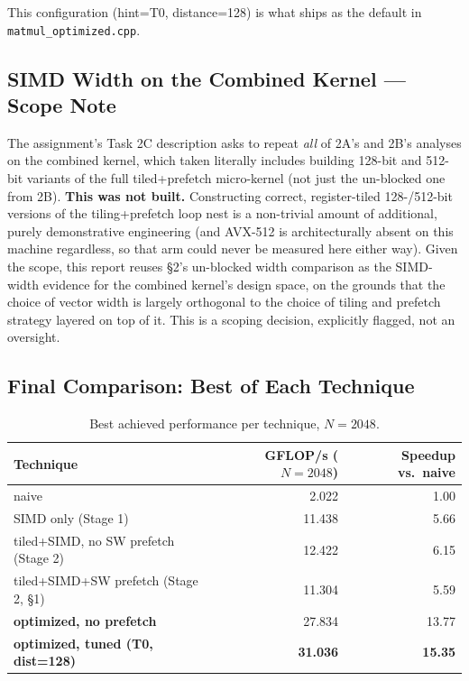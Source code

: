 \documentclass[11pt]{article}
\begin{document}
This configuration (hint=T0, distance=128) is what ships as the default in
\texttt{matmul\_optimized.cpp}.

\subsection{SIMD Width on the Combined Kernel --- Scope Note}

The assignment's Task 2C description asks to repeat \emph{all} of 2A's and 2B's analyses
on the combined kernel, which taken literally includes building 128-bit and 512-bit
variants of the full tiled+prefetch micro-kernel (not just the un-blocked one from 2B).
\textbf{This was not built.} Constructing correct, register-tiled 128-/512-bit versions
of the tiling+prefetch loop nest is a non-trivial amount of additional, purely
demonstrative engineering (and AVX-512 is architecturally absent on this machine
regardless, so that arm could never be measured here either way). Given the scope, this
report reuses \S2's un-blocked width comparison as the SIMD-width evidence for the
combined kernel's design space, on the grounds that the choice of vector width is largely
orthogonal to the choice of tiling and prefetch strategy layered on top of it. This is a
scoping decision, explicitly flagged, not an oversight.

\subsection{Final Comparison: Best of Each Technique}

\begin{table}[h]
\centering
\begin{tabular}{l r r}
\toprule
Technique & {GFLOP/s ($N{=}2048$)} & {Speedup vs.\ naive} \\
\midrule
naive                                    & 2.022  & 1.00 \\
SIMD only (Stage 1)                      & 11.438 & 5.66 \\
tiled+SIMD, no SW prefetch (Stage 2)     & 12.422 & 6.15 \\
tiled+SIMD+SW prefetch (Stage 2, \S1)    & 11.304 & 5.59 \\
\textbf{optimized, no prefetch}          & 27.834 & 13.77 \\
\textbf{optimized, tuned (T0, dist=128)} & \bfseries 31.036 & \bfseries 15.35 \\
\bottomrule
\end{tabular}
\caption{Best achieved performance per technique, $N{=}2048$.}
\end{table}
\end{document}
